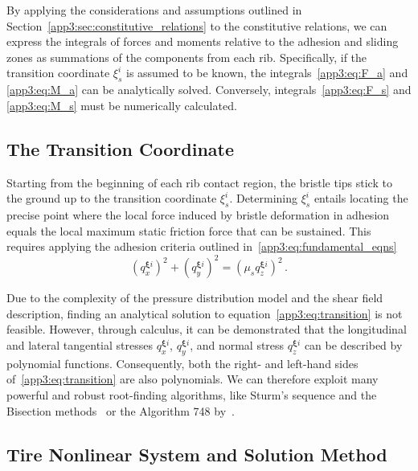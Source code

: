 By applying the considerations and assumptions outlined in Section~\ref{app3:sec:constitutive_relations} to the constitutive relations, we can express the integrals of forces and moments relative to the adhesion and sliding zones as summations of the components from each rib. Specifically, if the transition coordinate $\xi_s^i$ is assumed to be known, the integrals~\eqref{app3:eq:F_a} and \eqref{app3:eq:M_a} can be analytically solved. Conversely, integrals~\eqref{app3:eq:F_s} and \eqref{app3:eq:M_s} must be numerically calculated.

\subsection{The Transition Coordinate}

Starting from the beginning of each rib contact region, the bristle tips stick to the ground up to the transition coordinate $\xi_s^i$. Determining $\xi_s^i$ entails locating the precise point where the local force induced by bristle deformation in adhesion equals the local maximum static friction force that can be sustained. This requires applying the adhesion criteria outlined in~\eqref{app3:eq:fundamental_eqns}
%
\begin{equation}
  \left(q_{x}^{\bm{\xi}i}\right)^{2} + \left(q_{y}^{\bm{\xi}i}\right)^{2} = \left(\mu_s q_{z}^{\bm{\xi}i}\right)^{2} \, \text{.}
  \label{app3:eq:transition}
\end{equation}

Due to the complexity of the pressure distribution model and the shear field description, finding an analytical solution to equation~\eqref{app3:eq:transition} is not feasible. However, through calculus, it can be demonstrated that the longitudinal and lateral tangential stresses $q_{x}^{\bm{\xi}i}$, $q_{y}^{\bm{\xi}i}$, and normal stress $q_{z}^{\bm{\xi}i}$ can be described by polynomial functions. Consequently, both the right- and left-hand sides of~\eqref{app3:eq:transition} are also polynomials. We can therefore exploit many powerful and robust root-finding algorithms, like Sturm's sequence and the Bisection methods~\cite{bulirsch2002introduction} or the Algorithm 748 by~\citet{alefeld1995algorithm}.

\subsection{Tire Nonlinear System and Solution Method}

